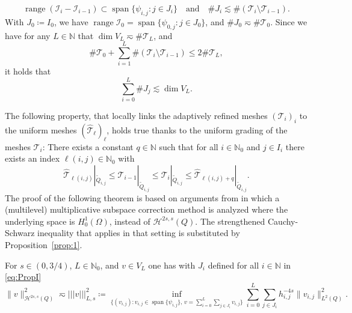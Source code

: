 \documentclass{amsart}
\providecommand{\tria}{\mathcal{T}}
\DeclareMathOperator{\Span}{span}
\DeclareMathOperator{\ran}{range}
\newcommand{\nrm}{| \! | \! |}
\newcommand{\N}{\mathbb N}
\newcommand{\cH}{\mathcal H}
\newcommand{\be}{\begin{equation}}
\newcommand{\ee}{\end{equation}}
\begin{document}
 \begin{equation}\label{eq:PropI}
 \ran(\mathcal{I}_i-\mathcal{I}_{i-1}) \subset \Span\{\psi_{i,j} \colon j \in J_i\} \quad \text{and}\quad \# J_i \lesssim \#(\tria_i \setminus \tria_{i-1}).
\end{equation}
With $J_0 \coloneqq I_0$, we have $\ran \mathcal{I}_0 = \Span\{\psi_{0,j} \colon j \in J_0\}$, and $\# J_0 \eqsim \# \tria_0$.
Since we have for any $L \in \N$ that $\dim V_L \eqsim \# \tria_L$, and \cite[eq. (3.1)]{BinevDeVore04}
\begin{equation*}
\# \tria_0+ \sum_{i=1}^L \# (\tria_i \setminus \tria_{i-1}) \leq 2 \# \tria_L,
\end{equation*}
it holds that
\be \label{eq:compl}
\sum_{i=0}^L \# J_j \lesssim \dim V_L.
\ee

The following property, that locally links the adaptively refined meshes $(\tria_i)_i$ to the uniform meshes $(\widehat{\tria}_\ell)_\ell$, holds true thanks to the uniform grading of the meshes $\tria_i$: There exists a constant $q \in \N$ such that for all $i \in \N_0$ and $j \in I_i$ there exists an index $\ell(i,j) \in \N_0$ with
\be \label{eq:1}
\widehat{\tria}_{\ell(i,j)}|_{\tilde{Q}_{i,j}} \leq \tria_{i-1}|_{\tilde{Q}_{i,j}} \leq \tria_i|_{\tilde{Q}_{i,j}} \leq \widehat{\tria}_{\ell(i,j)+q}|_{\tilde{Q}_{i,j}}.
\ee
%
The proof of the following theorem is based on arguments from \cite{WuZheng17} in which a (multilevel) multiplicative subspace correction method is analyzed where the underlying space is $H^1_0(\Omega)$, instead of $\cH^{2s,s}(Q)$. The strengthened Cauchy-Schwarz inequality that applies in that setting is substituted by Proposition~\ref{prop:1}.

\begin{theorem}\label{thm:normEqui} For $s \in (0,3/4)$, $L \in \N_0$, and $v \in V_L$ one has with $J_i$ defined for all $i\in \mathbb{N}$ in \eqref{eq:PropI}
\begin{equation*}
\|v\|^2_{\cH^{2s,s}(Q)} \eqsim \nrm v\nrm_{L,s}^2 \coloneqq
\inf_{\{(v_{i,j})\colon v_{i,j}\in \Span\{\psi_{i,j}\},\,v=\sum\limits_{i=0}^L\sum\limits_{j \in J_i} v_{i,j}\}} 
\sum_{i=0}^L\sum_{j \in J_i} h_{i,j}^{-4s}\|v_{i,j}\|_{L^2(Q)}^2.
\end{equation*}
\end{theorem}
\end{document}
